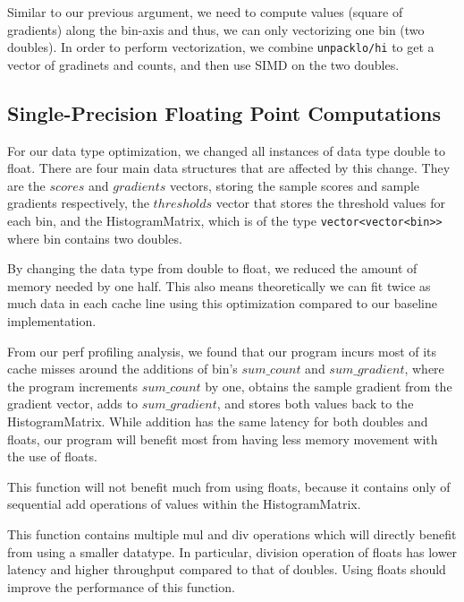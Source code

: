 Similar to our previous argument, we need to compute values (square of gradients) along the bin-axis and thus, we can only vectorizing one bin (two doubles).
In order to perform vectorization, we combine \texttt{unpacklo/hi} to get a vector of gradinets and counts, and then use SIMD on the two doubles.


\subsection{Single-Precision Floating Point Computations}
For our data type optimization, we changed all instances of data type double to float. There are four main data structures that are affected by this change. They are the $scores$ and $gradients$ vectors, storing the sample scores and sample gradients respectively, the $thresholds$ vector that stores the threshold values for each bin, and the HistogramMatrix, which is of the type \texttt{vector\textless{vector}\textless{bin}\textgreater{}\textgreater{}} where bin contains two doubles.

By changing the data type from double to float, we reduced the amount of memory needed by one half. This also means theoretically we can fit twice as much data in each cache line using this optimization compared to our baseline implementation.

From our perf profiling analysis, we found that our program incurs most of its cache misses around the additions of bin's $sum\_count$ and $sum\_gradient$, where the program increments $sum\_count$ by one, obtains the sample gradient from the gradient vector, adds to $sum\_gradient$, and stores both values back to the HistogramMatrix. While addition has the same latency for both doubles and floats, our program will benefit most from having less memory movement with the use of floats.

This function will not benefit much from using floats, because it contains only of sequential add operations of values within the HistogramMatrix.

This function contains multiple mul and div operations which will directly benefit from using a smaller datatype. In particular, division operation of floats has lower latency and higher throughput compared to that of doubles. Using floats should improve the performance of this function.

